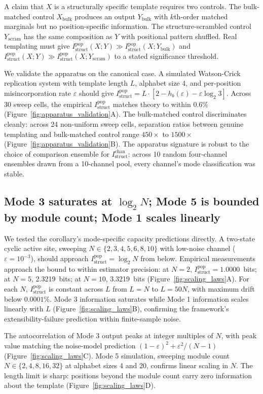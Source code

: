 \documentclass[aps,prx,reprint,amsmath,amssymb,floatfix,superscriptaddress,nofootinbib]{revtex4-2}
\theoremstyle{plain-thm}
\theoremstyle{definition-thm}
\newcommand{\Istructpop}{I_{\mathrm{struct}}^{\mathrm{pop}}}
\newcommand{\Istructchan}{I_{\mathrm{struct}}^{\mathrm{chan}}}
\newcommand{\Hbin}{h_b}
\begin{document}
A claim that $X$ is a structurally specific template requires two controls. The bulk-matched control $X_{\mathrm{bulk}}$ produces an output $Y_{\mathrm{bulk}}$ with $k$th-order matched marginals but no position-specific information. The structure-scrambled control $Y_{\mathrm{scram}}$ has the same composition as $Y$ with positional pattern shuffled. Real templating must give $\Istructpop(X; Y) \gg \Istructpop(X; Y_{\mathrm{bulk}})$ and $\Istructpop(X; Y) \gg \Istructpop(X; Y_{\mathrm{scram}})$ to a stated significance threshold.

We validate the apparatus on the canonical case. A simulated Watson-Crick replication system with template length $L$, alphabet size 4, and per-position misincorporation rate $\varepsilon$ should give $\Istructpop = L \cdot \left[2 - \Hbin(\varepsilon) - \varepsilon \log_2 3\right]$. Across 30 sweep cells, the empirical $\Istructpop$ matches theory to within 0.6\% (Figure~\ref{fig:apparatus_validation}A). The bulk-matched control discriminates cleanly: across 24 non-uniform sweep cells, separation ratios between genuine templating and bulk-matched control range $450 \times$ to $1500 \times$ (Figure~\ref{fig:apparatus_validation}B). The apparatus signature is robust to the choice of comparison ensemble for $\Istructchan$: across 10 random four-channel ensembles drawn from a 10-channel pool, every channel's mode classification was stable.

\subsection{Mode 3 saturates at $\log_2 N$; Mode 5 is bounded by module count; Mode 1 scales linearly}

We tested the corollary's mode-specific capacity predictions directly. A two-state cyclic active site, sweeping $N \in \{2, 3, 4, 5, 6, 8, 10\}$ with low-noise channel ($\varepsilon = 10^{-3}$), should approach $\Istructpop = \log_2 N$ from below. Empirical measurements approach the bound to within estimator precision: at $N = 2$, $\Istructpop = 1.0000$~bits; at $N = 5$, 2.3219~bits; at $N = 10$, 3.3219~bits (Figure~\ref{fig:scaling_laws}A). For each $N$, $\Istructpop$ is constant across $L$ from $L = N$ to $L = 50N$, with maximum drift below $0.0001\%$. Mode 3 information saturates while Mode 1 information scales linearly with $L$ (Figure~\ref{fig:scaling_laws}B), confirming the framework's extensibility-failure prediction within finite-sample noise.

The autocorrelation of Mode 3 output peaks at integer multiples of $N$, with peak value matching the noise-model prediction $(1 - \varepsilon)^2 + \varepsilon^2/(N - 1)$ (Figure~\ref{fig:scaling_laws}C). Mode 5 simulation, sweeping module count $N \in \{2, 4, 8, 16, 32\}$ at alphabet sizes 4 and 20, confirms linear scaling in $N$. The length limit is sharp: positions beyond the module count carry zero information about the template (Figure~\ref{fig:scaling_laws}D).
\end{document}
